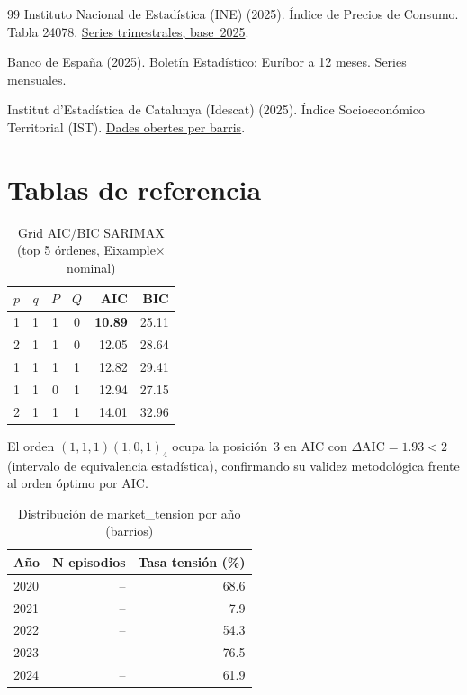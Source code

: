 \documentclass[10pt,a4paper,twocolumn]{article}
\begin{document}
\begin{thebibliography}{99}
{Instituto Nacional de Estadística (INE)} (2025).
Índice de Precios de Consumo. Tabla 24078.
\href{https://www.ine.es/jaxiT3/Datos.htm?t=24078}{Series trimestrales, base~2025}.

{Banco de España} (2025).
Boletín Estadístico: Euríbor a 12 meses.
\href{https://app.bde.es/bie_www/bie_wwwias/xml/Arranque.html?Idioma=es}{Series mensuales}.

{Institut d'Estadística de Catalunya (Idescat)} (2025).
Índice Socioeconómico Territorial (IST).
\href{https://www.idescat.cat/dades/obertes/ist/}{Dades obertes per barris}.

\end{thebibliography}
\usepackage{float}
\appendix

\section{Tablas de referencia}
\label{app:tablas}

\begin{table}[H]
\caption{Grid AIC/BIC SARIMAX (top 5 órdenes, Eixample$\times$nominal)}
\centering\small
\begin{tabular}{ccccrr}
\toprule
$p$ & $q$ & $P$ & $Q$ & AIC & BIC \\
\midrule
1 & 1 & 1 & 0 & \textbf{10.89} & 25.11 \\
2 & 1 & 1 & 0 & 12.05 & 28.64 \\
1 & 1 & 1 & 1 & 12.82 & 29.41 \\
1 & 1 & 0 & 1 & 12.94 & 27.15 \\
2 & 1 & 1 & 1 & 14.01 & 32.96 \\
\bottomrule
\end{tabular}
\end{table}

\noindent El orden $(1,1,1)(1,0,1)_4$ ocupa la posición~3 en AIC con
$\Delta\text{AIC}{=}1.93 < 2$ (intervalo de equivalencia estadística),
confirmando su validez metodológica frente al orden óptimo por AIC.

\begin{table}[H]
\caption{Distribución de market\_tension por año (barrios)}
\centering\small
\begin{tabular}{lrr}
\toprule
Año & N episodios & Tasa tensión (\%) \\
\midrule
2020 & -- & 68.6 \\
2021 & -- & 7.9  \\
2022 & -- & 54.3 \\
2023 & -- & 76.5 \\
2024 & -- & 61.9 \\
\bottomrule
\end{tabular}
\end{table}
\end{document}
